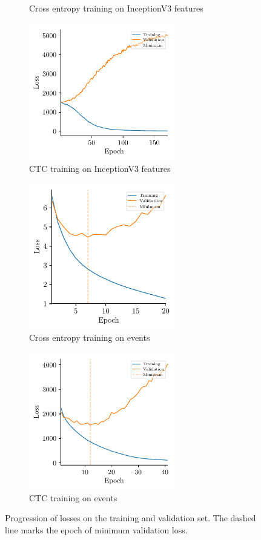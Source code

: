 \begin{figure}[H]
\begin{subfigure}[t]{3in}
    \caption{Cross entropy training on InceptionV3 features}
    \label{fig:losses-ce-iv3}
  \end{subfigure}
  \hfill
  \begin{subfigure}[t]{3in}
  \centering
    \includegraphics[width=2.5in]{figures/results/losses/ctc-inceptionv3}
    \caption{CTC training on InceptionV3 features}
    \label{fig:losses-ctc-iv3}
  \end{subfigure}
  \begin{subfigure}[t]{3in}
  \centering
    \includegraphics[width=2.5in]{figures/results/losses/gru-events}
    \caption{Cross entropy training on events}
    \label{fig:losses-ce-events}
  \end{subfigure}
  \hfill
  \begin{subfigure}[t]{3in}
  \centering
    \includegraphics[width=2.5in]{figures/results/losses/ctc-events}
    \caption{CTC training on events}
    \label{fig:losses-ctc-events}
  \end{subfigure}
  \caption{Progression of losses on the training and validation set. The dashed
    line marks the epoch of minimum validation loss.}
  \label{fig:losses}
\end{figure}
